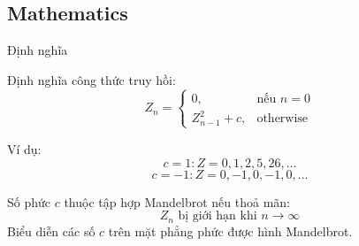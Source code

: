 \documentclass{beamer}
\begin{document}



\subsection{Mathematics}

\begin{frame}{Định nghĩa}

  Định nghĩa công thức truy hồi:
  \[ 
    Z_n =
    \begin{cases}
      0,& \text{nếu } n = 0\\
      Z_{n-1} ^ 2 + c,              & \text{otherwise}
    \end{cases}
  \]

  Ví dụ:
  \[
    c=1: Z = 0, 1, 2, 5, 26,\dots
  \]
  \[
    c=-1: Z = 0, -1, 0, -1, 0,\dots
  \]
  
  Số phức $c$ thuộc tập hợp Mandelbrot nếu thoả mãn:
  \[
    Z_n \text{ bị giới hạn khi } n \rightarrow \infty
  \]
  Biểu diễn các số ${c}$ trên mặt phẳng phức được hình Mandelbrot.
\end{frame}

\end{document}
